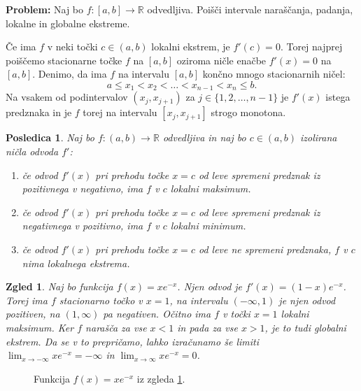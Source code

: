 \documentclass[10pt, a4paper]{article}
\newtheorem{posledica}[izr]{Posledica}
\newtheorem{zgled}[izr]{Zgled}
\newcommand{\R}{\mathbb {R}}
\newcommand{\limf}[3]{\lim_{#1 \to #2} {#3}}
\begin{document}
\textbf{Problem:} Naj bo $f: [a, b] \rightarrow \R$ odvedljiva. 
Poišči intervale naraščanja, padanja, lokalne in globalne ekstreme.

Če ima $f$ v neki točki $c \in (a, b)$ lokalni ekstrem, je $f'(c) = 0.$
Torej najprej poiščemo stacionarne točke $f$ na $[a, b]$ oziroma ničle enačbe $f'(x) = 0$ na $[a, b]$.
Denimo, da ima $f$ na intervalu $[a, b]$ končno mnogo stacionarnih ničel:
$$a \leq x_1 < x_2 < \dots < x_{n-1} < x_n \leq b.$$
Na vsakem od podintervalov $(x_j, x_{j+1})$ za $j \in \{1, 2, \dots, n-1\}$ je $f'(x)$ istega predznaka in je $f$ torej na intervalu $[x_j, x_{j+1}]$ strogo monotona.

\begin{posledica}
    Naj bo $f: (a,b) \rightarrow \R$ odvedljiva in naj bo $c \in (a, b)$ izolirana ničla odvoda $f'$:
    \begin{enumerate}
        \item če odvod $f'(x)$ pri prehodu točke $x = c$ od leve spremeni predznak iz pozitivnega v negativno, ima $f$ v $c$ lokalni maksimum.
        \item če odvod $f'(x)$ pri prehodu točke $x = c$ od leve spremeni predznak iz negativnega v pozitivno, ima $f$ v $c$ lokalni minimum.
        \item če odvod $f'(x)$ pri prehodu točke $x = c$ od leve ne spremeni predznaka, $f$ v $c$ nima lokalnega ekstrema.
    \end{enumerate}
\end{posledica}

\begin{zgled}
    \label{zgl:4}
    Naj bo funkcija $f(x) = x e^{-x}$. 
    Njen odvod je $f'(x) = (1-x)e^{-x}$.
    Torej ima $f$ stacionarno točko v $x = 1$, na intervalu $(-\infty, 1)$ je njen odvod pozitiven, na $(1,\infty)$ pa negativen.
    Očitno ima $f$ v točki $x = 1$ lokalni maksimum.
    Ker $f$ narašča za vse $x < 1$ in pada za vse $x > 1$, je to tudi globalni ekstrem.
    Da se v to prepričamo, lahko izračunamo še limiti $\limf{x}{-\infty}{xe^{-x}} = -\infty$ in $\limf{x}{\infty}{xe^{-x}} = 0$.
\end{zgled}

\begin{figure}[hbt!]
    \centering
    \caption{Funkcija $f(x) = x e^{-x}$ iz zgleda \ref{zgl:4}.}
\end{figure}
\end{document}
